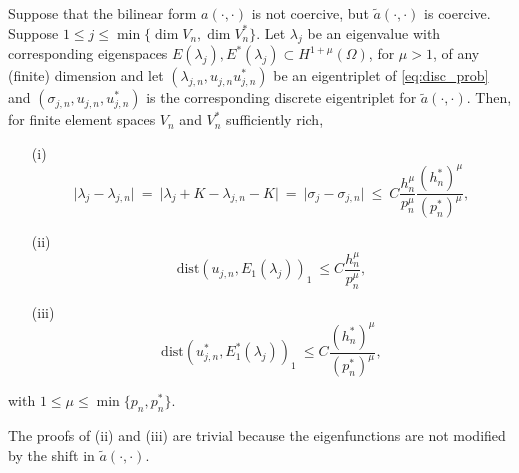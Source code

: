 \documentclass[smallextended]{svjour3}
\begin{document}
\begin{lemma}
\label{lm:adj_2}
Suppose  that the bilinear form $a(\cdot,\cdot)$ is not coercive, but  $\tilde a(\cdot,\cdot)$ is coercive.
Suppose
$ 1 \leq j\leq \min\{\dim V_n,\dim V_n^*\}$. Let
$\lambda_j$ be an eigenvalue with
corresponding eigenspaces $E(\lambda_j),E^*(\lambda_j)\subset H^{1+\mu}(\Omega)$, for $\mu>1$, of any (finite) dimension  and
let $(\lambda_{j,n},u_{j,n}u_{j,n}^*)$ be an  eigentriplet  of \eqref{eq:disc_prob} and $(\sigma_{j,n},u_{j,n},u_{j,n}^*)$ is the corresponding discrete eigentriplet for $\tilde a(\cdot,\cdot)$.
Then, for finite element spaces $V_n$ and $V_n^*$ sufficiently rich,
\begin{itemize}
\item[(i)] 
\begin{equation}\label{eq:supereig_2}
\vert \lambda_j - \lambda_{j,n} \vert\ = \ \vert \lambda_j+K - \lambda_{j,n}-K \vert 
\ = \ \vert \sigma_j - \sigma_{j,n} \vert\ \leq \ C
\frac{h_n^{\mu} }{p_n^{\mu}}\frac{(h_n^*)^{\mu} }{(p_n^*)^{\mu}},
\end{equation}
\item[(ii)] 
\begin{equation}
\label{eq:energy_2} \mathrm{dist}(
u_{j,n},E_1(\lambda_j))_{1} \ \leq
C \frac{h_n^{\mu}}{p_n^{\mu}}, 
\end{equation}
\item[(iii)]
\begin{equation}
\label{eq:energy_dual_2} \mathrm{dist}(
u_{j,n}^*,E_1^*(\lambda_j))_{1} \ \leq
C \frac{(h_n^*)^{\mu}}{(p_n^*)^{\mu}}, 
\end{equation}
\end{itemize}
with $1\leq \mu\leq \min\{p_n,p_n^*\}$.
\end{lemma}

The proofs of (ii) and (iii) are trivial because the eigenfunctions are not modified by the shift in  $\tilde a(\cdot,\cdot)$.

\end{document}
